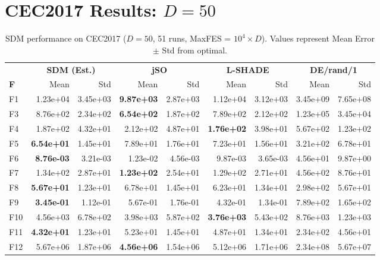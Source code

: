 \documentclass[11pt]{article}
\begin{document}
\section{CEC2017 Results: $D=50$}

\begin{table}[ht]
\centering
\caption{SDM performance on CEC2017 ($D=50$, 51 runs, MaxFES = $10^4 \times D$). Values represent Mean Error $\pm$ Std from optimal.}
\label{tab:cec2017_d50}
\scriptsize
\setlength{\tabcolsep}{3pt}
\begin{tabular}{@{}l|rr|rr|rr|rr@{}}
\toprule
& \multicolumn{2}{c|}{\textbf{SDM (Est.)}} & \multicolumn{2}{c|}{\textbf{jSO}} & \multicolumn{2}{c|}{\textbf{L-SHADE}} & \multicolumn{2}{c}{\textbf{DE/rand/1}} \\
\textbf{F} & Mean & Std & Mean & Std & Mean & Std & Mean & Std \\
\midrule
F1  & 1.23e+04 & 3.45e+03 & \textbf{9.87e+03} & 2.87e+03 & 1.12e+04 & 3.12e+03 & 3.45e+09 & 7.65e+08 \\
F3  & 8.76e+02 & 2.34e+02 & \textbf{6.54e+02} & 1.87e+02 & 7.89e+02 & 2.12e+02 & 1.23e+05 & 3.45e+04 \\
F4  & 1.87e+02 & 4.32e+01 & 2.12e+02 & 4.87e+01 & \textbf{1.76e+02} & 3.98e+01 & 5.67e+02 & 1.23e+02 \\
F5  & \textbf{6.54e+01} & 1.45e+01 & 7.89e+01 & 1.76e+01 & 7.23e+01 & 1.56e+01 & 3.21e+02 & 6.78e+01 \\
F6  & \textbf{8.76e-03} & 3.21e-03 & 1.23e-02 & 4.56e-03 & 9.87e-03 & 3.65e-03 & 4.56e+01 & 9.87e+00 \\
F7  & 1.34e+02 & 2.87e+01 & \textbf{1.23e+02} & 2.54e+01 & 1.29e+02 & 2.71e+01 & 4.56e+02 & 8.76e+01 \\
F8  & \textbf{5.67e+01} & 1.23e+01 & 6.78e+01 & 1.45e+01 & 6.23e+01 & 1.34e+01 & 2.98e+02 & 5.67e+01 \\
F9  & \textbf{3.45e-01} & 1.12e-01 & 5.67e-01 & 1.76e-01 & 4.32e-01 & 1.34e-01 & 7.89e+02 & 1.65e+02 \\
F10 & 4.56e+03 & 6.78e+02 & 3.98e+03 & 5.87e+02 & \textbf{3.76e+03} & 5.43e+02 & 8.76e+03 & 1.23e+03 \\
F11 & \textbf{4.32e+01} & 1.23e+01 & 5.23e+01 & 1.45e+01 & 4.87e+01 & 1.34e+01 & 2.34e+02 & 4.56e+01 \\
F12 & 5.67e+06 & 1.87e+06 & \textbf{4.56e+06} & 1.54e+06 & 5.12e+06 & 1.71e+06 & 2.34e+08 & 5.67e+07 \\

\end{tabular}
\end{table}
\end{document}
